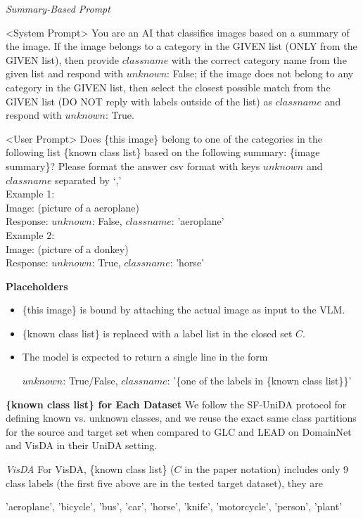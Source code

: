 \documentclass[10pt]{article} %
\begin{document}
{\em Summary-Based Prompt}
\begin{promptquote}
<System Prompt> You are an AI that classifies images based on a summary of the image.
If the image belongs to a category in the GIVEN list (ONLY from the GIVEN list), 
then provide $classname$ with the correct category name from the given list 
and respond with $unknown$: False; 
if the image does not belong to any category in the GIVEN list, 
then select the closest possible match from the GIVEN list 
(DO NOT reply with labels outside of the list) 
as $classname$ and respond with $unknown$: True.\\
\end{promptquote}
\begin{promptquote}
<User Prompt> Does \{this image\} belong to one of the categories in the following list \{known class list\} based on the following summary: \{image summary\}? Please format the answer csv format with keys $unknown$ and $class name$ separated by `,' \\
Example 1:\\
Image: (picture of a aeroplane)\\
Response: $unknown$: False, $class name$: 'aeroplane'\\
Example 2:\\
Image: (picture of a donkey)\\
Response: $unknown$: True, $class name$: 'horse'
\end{promptquote}

\textbf{Placeholders}
\begin{itemize}
    \item \{this image\} is bound by attaching the actual image as input to the VLM.
    \item \{known class list\} is replaced with a label list in the closed set $C$.
    \item The model is expected to return a single line in the form
     \begin{promptquote}
    $unknown$: {True/False}, $classname$: '\{one of the labels in \{known class list\}\}'
    \end{promptquote}
\end{itemize}
\textbf{\{known class list\} for Each Dataset}
We follow the SF-UniDA protocol for defining known vs. unknown classes, and we reuse the exact same class partitions for the source and target set when compared to GLC and LEAD on DomainNet and VisDA in their UniDA setting.

{\em VisDA}
For VisDA, \{known class list\} ($C$ in the paper notation) includes only 9 class labels (the first five above are in the tested target dataset), they are 
\begin{promptquote}
    'aeroplane', 'bicycle', 'bus', 'car', 'horse', 'knife', 'motorcycle', 'person', 'plant'
\end{promptquote}
\end{document}
